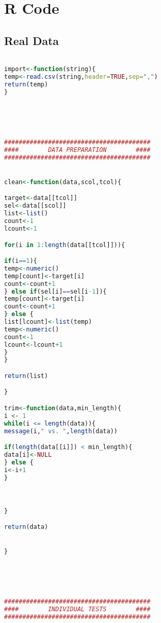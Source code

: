 \section{R Code}

\subsection{Real Data}


\lstset{basicstyle=\tiny,style=myStyle,breaklines=true,}

\begin{lstlisting}[language=R]

import<-function(string){
temp<-read.csv(string,header=TRUE,sep=",")
return(temp)
}





########################################
####		DATA PREPARATION		####
########################################


clean<-function(data,scol,tcol){

target<-data[[tcol]]
sel<-data[[scol]]
list<-list()
count<-1
lcount<-1

for(i in 1:length(data[[tcol]])){

if(i==1){
temp<-numeric()
temp[count]<-target[i]
count<-count+1
} else if(sel[i]==sel[i-1]){
temp[count]<-target[i]
count<-count+1
} else {
list[lcount]<-list(temp)
temp<-numeric()
count<-1
lcount<-lcount+1
}
}

return(list)

}

trim<-function(data,min_length){
i <- 1
while(i <= length(data)){
message(i," vs. ",length(data))

if(length(data[[i]]) < min_length){
data[i]<-NULL
} else {
i<-i+1
}



}

return(data)


}





########################################
####		INDIVIDUAL TESTS		####
########################################


\end{lstlisting}
